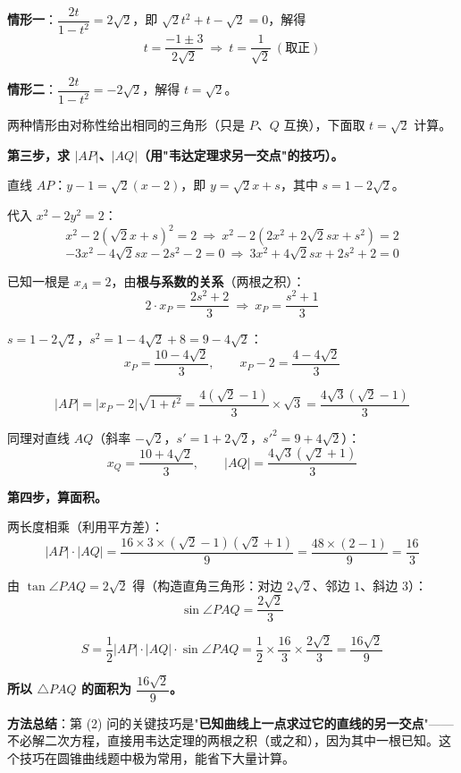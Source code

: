 \textbf{情形一}：$\dfrac{2t}{1-t^{2}}=2\sqrt2$，即 $\sqrt2t^{2}+t-\sqrt2=0$，解得
\[t=\frac{-1\pm3}{2\sqrt2}\ \Longrightarrow\ t=\frac1{\sqrt2}\ (\text{取正})\]

\textbf{情形二}：$\dfrac{2t}{1-t^{2}}=-2\sqrt2$，解得 $t=\sqrt2$。

两种情形由对称性给出相同的三角形（只是 $P$、$Q$ 互换），下面取 $t=\sqrt2$ 计算。

\textbf{第三步，求 $|AP|$、$|AQ|$（用"韦达定理求另一交点"的技巧）。}

直线 $AP$：$y-1=\sqrt2(x-2)$，即 $y=\sqrt2x+s$，其中 $s=1-2\sqrt2$。

代入 $x^{2}-2y^{2}=2$：
\[x^{2}-2\left(\sqrt2x+s\right)^{2}=2\ \Longrightarrow\ x^{2}-2\left(2x^{2}+2\sqrt2sx+s^{2}\right)=2\]
\[-3x^{2}-4\sqrt2sx-2s^{2}-2=0\ \Longrightarrow\ 3x^{2}+4\sqrt2sx+2s^{2}+2=0\]

已知一根是 $x_A=2$，由\textbf{根与系数的关系}（两根之积）：
\[2\cdot x_P=\frac{2s^{2}+2}3\ \Longrightarrow\ x_P=\frac{s^{2}+1}3\]

$s=1-2\sqrt2$，$s^{2}=1-4\sqrt2+8=9-4\sqrt2$：
\[x_P=\frac{10-4\sqrt2}3,\qquad x_P-2=\frac{4-4\sqrt2}3\]

\[|AP|=\left|x_P-2\right|\sqrt{1+t^{2}}=\frac{4\left(\sqrt2-1\right)}3\times\sqrt3=\frac{4\sqrt3\left(\sqrt2-1\right)}3\]

同理对直线 $AQ$（斜率 $-\sqrt2$，$s'=1+2\sqrt2$，$s'^{2}=9+4\sqrt2$）：
\[x_Q=\frac{10+4\sqrt2}3,\qquad |AQ|=\frac{4\sqrt3\left(\sqrt2+1\right)}3\]

\textbf{第四步，算面积。}

两长度相乘（利用平方差）：
\[|AP|\cdot|AQ|=\frac{16\times3\times\left(\sqrt2-1\right)\left(\sqrt2+1\right)}9=\frac{48\times(2-1)}9=\frac{16}3\]

由 $\tan\angle PAQ=2\sqrt2$ 得（构造直角三角形：对边 $2\sqrt2$、邻边 $1$、斜边 $3$）：
\[\sin\angle PAQ=\frac{2\sqrt2}3\]

\[S=\frac12|AP|\cdot|AQ|\cdot\sin\angle PAQ=\frac12\times\frac{16}3\times\frac{2\sqrt2}3=\frac{16\sqrt2}9\]

\textbf{所以 $\triangle PAQ$ 的面积为 $\dfrac{16\sqrt2}9$。}

\begin{gktip}
\textbf{方法总结}：第 (2) 问的关键技巧是"\textbf{已知曲线上一点求过它的直线的另一交点}"——不必解二次方程，直接用韦达定理的两根之积（或之和），因为其中一根已知。这个技巧在圆锥曲线题中极为常用，能省下大量计算。
\end{gktip}

\par\medskip

